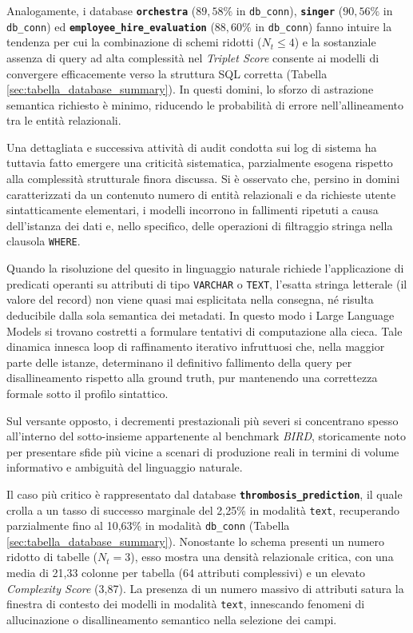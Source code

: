 Analogamente, i database \textbf{\texttt{orchestra}} (\(89,58\%\) in
\texttt{db\_conn}), \textbf{\texttt{singer}} (\(90,56\%\) in
\texttt{db\_conn}) ed \textbf{\texttt{employee\_hire\_evaluation}}
(\(88,60\%\) in \texttt{db\_conn}) fanno intuire la tendenza per cui la
combinazione di schemi ridotti (\(N_t \le 4\)) e la sostanziale assenza
di query ad alta complessità nel \emph{Triplet Score} consente ai
modelli di convergere efficacemente verso la struttura SQL corretta
(Tabella \ref{sec:tabella_database_summary}). In questi domini, lo sforzo di astrazione semantica
richiesto è minimo, riducendo le probabilità di errore nell'allineamento
tra le entità relazionali.

Una dettagliata e successiva attività di audit condotta sui log
di sistema ha tuttavia fatto emergere una criticità sistematica,
parzialmente esogena rispetto alla complessità strutturale finora
discussa. Si è osservato che, persino in domini caratterizzati da un
contenuto numero di entità relazionali e da richieste utente
sintatticamente elementari, i modelli incorrono in fallimenti ripetuti a
causa dell'istanza dei dati e, nello specifico, delle operazioni di
filtraggio stringa nella clausola \texttt{WHERE}.

Quando la risoluzione del quesito in linguaggio naturale richiede
l'applicazione di predicati operanti su attributi di tipo
\texttt{VARCHAR} o \texttt{TEXT}, l'esatta stringa letterale (il
valore del record) non viene quasi mai esplicitata nella
consegna, né risulta deducibile dalla sola semantica dei metadati. In
questo modo i Large Language Models si trovano costretti a formulare
tentativi di computazione alla cieca. Tale dinamica innesca loop di
raffinamento iterativo infruttuosi che, nella maggior parte delle
istanze, determinano il definitivo fallimento della query per
disallineamento rispetto alla ground truth, pur mantenendo una
correttezza formale sotto il profilo sintattico.

Sul versante opposto, i decrementi prestazionali più severi si
concentrano spesso all'interno del sotto-insieme appartenente
al benchmark \emph{BIRD}, storicamente noto per presentare sfide più
vicine a scenari di produzione reali in termini di volume informativo e
ambiguità del linguaggio naturale.

Il caso più critico è rappresentato dal database
\textbf{\texttt{thrombosis\_prediction}}, il quale crolla a un tasso di
successo marginale del 2,25\% in modalità \texttt{text},
recuperando parzialmente fino al 10,63\% in modalità
\texttt{db\_conn} (Tabella \ref{sec:tabella_database_summary}). Nonostante lo schema presenti un numero
ridotto di tabelle (\(N_t = 3\)), esso mostra una densità relazionale
critica, con una media di 21,33 colonne per tabella (64
attributi complessivi) e un elevato \emph{Complexity Score} (3,87). La
presenza di un numero massivo di attributi satura la finestra di
contesto dei modelli in modalità \texttt{text}, innescando
fenomeni di allucinazione o disallineamento semantico nella selezione
dei campi.

